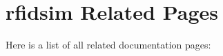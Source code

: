 \section{rfidsim Related Pages}
Here is a list of all related documentation pages:\begin{CompactList}
\item {}

\end{CompactList}
